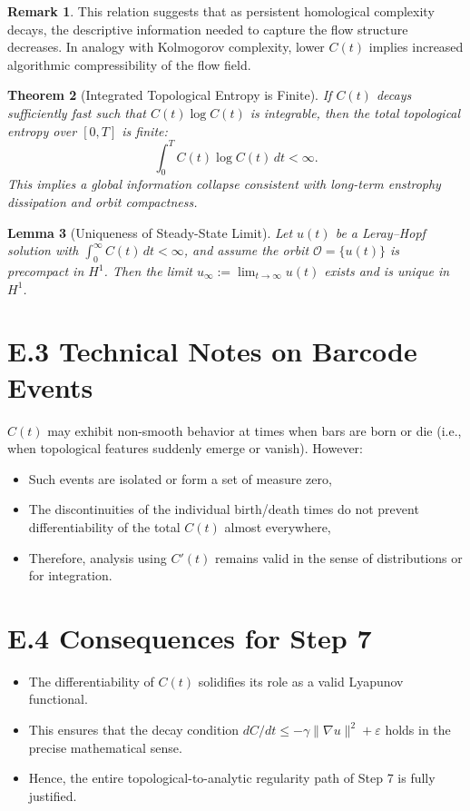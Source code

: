 \documentclass[11pt]{article}
\newtheorem{theorem}{Theorem}[section]
\newtheorem{lemma}[theorem]{Lemma}
\theoremstyle{definition}
\newtheorem{remark}[theorem]{Remark}
\begin{document}
\begin{remark}
This relation suggests that as persistent homological complexity decays, the descriptive information needed to capture the flow structure decreases. In analogy with Kolmogorov complexity, lower $C(t)$ implies increased algorithmic compressibility of the flow field.
\end{remark}

\begin{theorem}[Integrated Topological Entropy is Finite]
If $C(t)$ decays sufficiently fast such that $C(t) \log C(t)$ is integrable, then the total topological entropy over $[0,T]$ is finite:
\[
\int_0^T C(t) \log C(t)\, dt < \infty.
\]
This implies a global information collapse consistent with long-term enstrophy dissipation and orbit compactness.
\end{theorem}

\begin{lemma}[Uniqueness of Steady-State Limit]
Let $u(t)$ be a Leray--Hopf solution with $\int_0^\infty C(t)\,dt < \infty$, and assume the orbit $\mathcal{O} = \{u(t)\}$ is precompact in $H^1$. Then the limit $u_\infty := \lim_{t \to \infty} u(t)$ exists and is unique in $H^1$.
\end{lemma}

\section*{E.3 Technical Notes on Barcode Events}
$C(t)$ may exhibit non-smooth behavior at times when bars are born or die (i.e., when topological features suddenly emerge or vanish). However:
\begin{itemize}
  \item Such events are isolated or form a set of measure zero,
  \item The discontinuities of the individual birth/death times do not prevent differentiability of the total $C(t)$ almost everywhere,
  \item Therefore, analysis using $C'(t)$ remains valid in the sense of distributions or for integration.
\end{itemize}

\section*{E.4 Consequences for Step 7}
\begin{itemize}
  \item The differentiability of $C(t)$ solidifies its role as a valid Lyapunov functional.
  \item This ensures that the decay condition $dC/dt \leq -\gamma \|\nabla u\|^2 + \varepsilon$ holds in the precise mathematical sense.
  \item Hence, the entire topological-to-analytic regularity path of Step 7 is fully justified.
\end{itemize}
\end{document}

